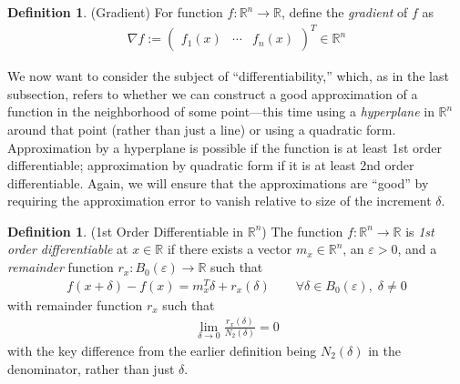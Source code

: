 \documentclass[12pt]{article}
\numberwithin{equation}{section} %
\theoremstyle{plain}
\theoremstyle{definition}
\newtheorem{defn}[thm]{Definition}
\theoremstyle{remark}
\newcommand{\R}{\mathbb{R}}
\newcommand{\Rn}{\mathbb{R}^n}
\begin{document}
\begin{defn}{(Gradient)}
For function $f:\Rn\rightarrow\R$, define the \emph{gradient} of $f$ as
\begin{align*}
  \nabla f :=
  \begin{pmatrix}
    f_1(x) & \cdots & f_n(x)
  \end{pmatrix}^T \in \Rn
\end{align*}
\end{defn}

We now want to consider the subject of ``differentiability,'' which, as
in the last subsection, refers to whether we can construct a good
approximation of a function in the neighborhood of some point---this
time using a \emph{hyperplane} in $\Rn$ around that point (rather than
just a line) or using a quadratic form.  Approximation by a hyperplane
is possible if the function is at least 1st order differentiable;
approximation by quadratic form if it is at least 2nd order
differentiable.  Again, we will ensure that the approximations are
``good'' by requiring the approximation error to vanish relative to size
of the increment $\delta$.

\begin{defn}{(1st Order Differentiable in $\Rn$)}
\label{defn:diffableRn}
The function $f:\Rn\rightarrow\R$ is \emph{1st order differentiable} at
$x\in\R$ if there exists a vector $m_x\in\Rn$, an $\varepsilon>0$, and a
\emph{remainder} function $r_x:B_0(\varepsilon)\rightarrow\R$ such that
\begin{align}
  \label{eq:diffapproxRn}
  f(x+\delta)-f(x) = m_x^T \delta + r_x(\delta)
  \qquad \forall \delta\in B_0(\varepsilon), \; \delta \neq 0
\end{align}
with remainder function $r_x$ such that
\begin{align}
  \label{lim:remainderRn}
  \lim_{\delta\rightarrow 0}
  \frac{r_x(\delta)}{N_2(\delta)}=0
\end{align}
with the key difference from the earlier definition being $N_2(\delta)$
in the denominator, rather than just $\delta$.
\end{defn}
\end{document}
